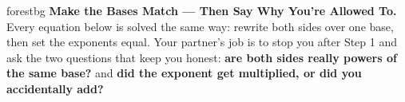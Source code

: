 \documentclass[10pt]{article}
\begin{document}
\namepartnerperiod

\vspace{0.08in}

\begin{headlinebox}{forestbg}
\small\textbf{Make the Bases Match --- Then Say Why You're Allowed To.} Every equation below is solved
the same way: rewrite both sides over one base, then set the exponents equal. Your partner's job is to
stop you after Step 1 and ask the two questions that keep you honest: \textbf{are both sides really
powers of the same base?} and \textbf{did the exponent get multiplied, or did you accidentally add?}
\end{headlinebox}

\vspace{0.06in}
\end{document}
